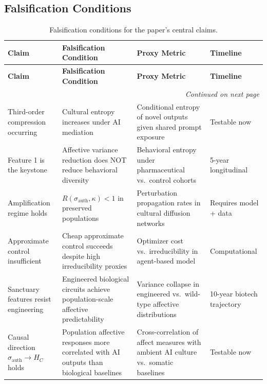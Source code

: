 \documentclass[11pt, a4paper]{article}
\theoremstyle{remark}
\begin{document}
\subsection{Falsification Conditions}\label{sec:falsification}

{\footnotesize
\begin{longtable}{p{} p{} p{} p{}}
\caption{Falsification conditions for the paper's central claims.} \label{tab:falsification} \\
\toprule
\textbf{Claim} & \textbf{Falsification Condition} & \textbf{Proxy Metric} & \textbf{Timeline} \\
\midrule
\endfirsthead
\toprule
\textbf{Claim} & \textbf{Falsification Condition} & \textbf{Proxy Metric} & \textbf{Timeline} \\
\midrule
\endhead
\midrule
\multicolumn{4}{r}{\textit{Continued on next page}} \\
\bottomrule
\endfoot
\bottomrule
\endlastfoot

Third-order compression occurring & Cultural entropy increases under AI mediation & Conditional entropy of novel outputs given shared prompt exposure & Testable now \\

Feature 1 is the keystone & Affective variance reduction does NOT reduce behavioral diversity & Behavioral entropy under pharmaceutical vs.\ control cohorts & 5-year longitudinal \\

Amplification regime holds & $R(\sigma_{\text{auth}}, \kappa) < 1$ in preserved populations & Perturbation propagation rates in cultural diffusion networks & Requires model + data \\

Approximate control insufficient & Cheap approximate control succeeds despite high irreducibility proxies & Optimizer cost vs.\ irreducibility in agent-based model & Computational \\

Sanctuary features resist engineering & Engineered biological circuits achieve population-scale affective predictability & Variance collapse in engineered vs.\ wild-type affective distributions & 10-year biotech trajectory \\

Causal direction $\sigma_{\text{auth}} \to H_C$ holds & Population affective responses more correlated with AI outputs than biological baselines & Cross-correlation of affect measures with ambient AI culture vs.\ somatic baselines & Testable now \\


\end{longtable}}
\end{document}
